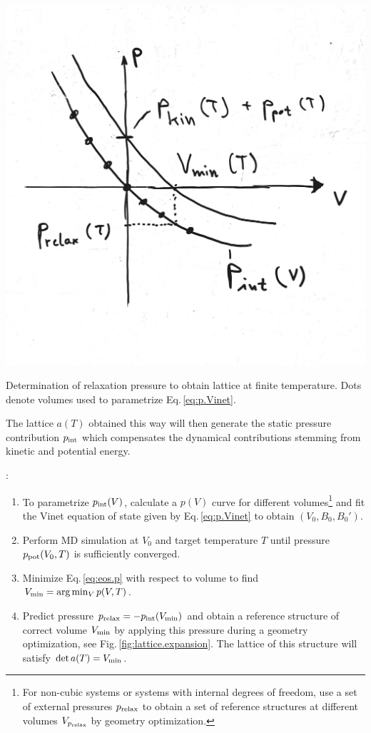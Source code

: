\begin{marginfigure}
	\includegraphics[width=\textwidth]{./sketches/lattice_expansion.jpg}
	\caption{Determination of relaxation pressure to obtain lattice at finite temperature. Dots denote volumes used to parametrize Eq.\,\eqref{eq:p.Vinet}.}
	\label{fig:lattice.expansion}
\end{marginfigure}
The lattice $a (T)$ obtained this way will then generate the static pressure contribution $p_{\rm int}$ which compensates the dynamical contributions stemming from kinetic and potential energy.

:
\begin{enumerate}
	\item To parametrize $p_{\rm int} (V)$, calculate a $p(V)$ curve for different volumes\footnote{For non-cubic systems or systems with internal degrees of freedom, use a set of external pressures $p_{\rm relax}$ to obtain a set of reference structures at different volumes $V_{p_{\rm relax}}$ by geometry optimization.} and fit the Vinet equation of state given by Eq.\,\eqref{eq:p.Vinet} to obtain $(V_0, B_0, B_0')$.
	\item Perform MD simulation at $V_0$ and target temperature $T$ until pressure $p_{\rm pot} (V_0, T)$ is sufficiently  converged.
	\item Minimize Eq.\,\eqref{eq:eos.p} with respect to volume to find $V_{\rm min} = \arg \min_V p (V, T)$.
	\item Predict pressure $p_{\rm relax} = - p_{\rm int} (V_{\rm min})$ and obtain a reference structure of correct volume $V_{\rm min}$ by applying this pressure during a geometry optimization, see Fig.\,\ref{fig:lattice.expansion}. The lattice of this structure will satisfy $\det a(T) = V_{\rm min}$.
\end{enumerate}

